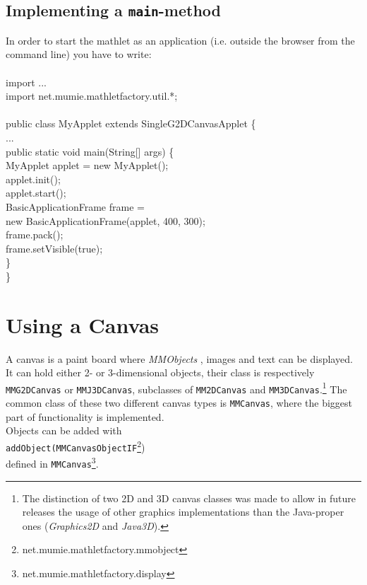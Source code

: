 \documentclass[a4paper,12pt]{book}
\newcommand{\mmos}{\emph{MMObjects }}
\begin{document}
  \subsection{Implementing a {\tt main}-method}
  In order to start the mathlet as an application (i.e. outside the browser from the
  command line) you have to write:\\\\
  {\small\ttfamily
  \indent import ...\\
  \indent import net.mumie.mathletfactory.util.*;\\\\
  \indent public class MyApplet extends SingleG2DCanvasApplet \{\\
  \indent\indent ...\\
  \indent\indent public static void main(String[] args) \{\\
  \indent\indent\indent MyApplet applet = new MyApplet();\\
  \indent\indent\indent applet.init();\\
  \indent\indent\indent applet.start();\\
  \indent\indent\indent BasicApplicationFrame frame = \\
  \indent\indent\indent\indent\indent\indent new BasicApplicationFrame(applet, 400, 300);\\
  \indent\indent\indent frame.pack();\\
  \indent\indent\indent frame.setVisible(true);\\
  \indent\indent\}\\
  \indent\}\\
  }
  
\section{Using a Canvas}
  A canvas is a paint board where \mmos, images and text can be displayed. It can hold either 2- or 3-dimensional
  objects, their class is respectively \verb|MMG2DCanvas| or \verb|MMJ3DCanvas|, subclasses of \verb|MM2DCanvas| and
  \verb|MM3DCanvas|.\footnote{The distinction of two 2D and 3D canvas classes was made to allow in future releases
  the usage of other graphics implementations than the Java-proper ones (\textit{Graphics2D} and \textit{Java3D}).}
  The common class of these two different canvas types is \verb|MMCanvas|, where the biggest part of functionality
  is implemented.\\
  Objects can be added with\\
  \indent \verb|addObject(MMCanvasObjectIF|\footnote{net.mumie.mathletfactory.mmobject})\\
  defined in \verb|MMCanvas|\footnote{net.mumie.mathletfactory.display}.
\end{document}
